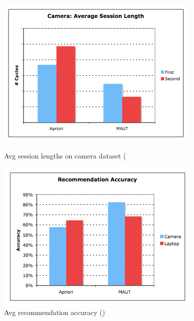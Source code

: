 \begin{figure}
\centering
\begin{minipage}{.45\textwidth}
  \centering
  \includegraphics[width=1\linewidth]{figures-bharath/camera_liveUser.png}
  \caption{Avg session lengths on camera dataset (\cite{liveUserStudy}}
  \label{fig:camera_liveUser}
\end{minipage}%
\;\;\;\;\;\;
\begin{minipage}{.45\textwidth}
  \centering
  \includegraphics[width=1\linewidth]{figures-bharath/accuracy_liveUser.png}
  \caption{Avg recommendation accuracy (\cite{liveUserStudy})}
  \label{fig:accuracy_liveUser}
\end{minipage}
\end{figure}

